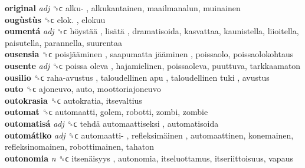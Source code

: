 \textbf{original} \emph{adj}  ␝ϲ   alku- , alkukantainen, maailmanalun, muinainen  \\
\textbf{ougùstùs} ␝ϲ   elok. , elokuu  \\
\textbf{oumentá} \emph{adj}  ␝ϲ   höystää ,  lisätä , dramatisoida, kasvattaa, kaunistella, liioitella, paisutella, parannella, suurentaa  \\
\textbf{ousensia} ␝ϲ   poisjääminen ,  saapumatta jääminen , poissaolo, poissaolokohtaus  \\
\textbf{ousente} \emph{adj}  ␝ϲ   poissa oleva , hajamielinen, poissaoleva, puuttuva, tarkkaamaton  \\
\textbf{ousilio} ␝ϲ   raha-avustus ,  taloudellinen apu ,  taloudellinen tuki , avustus  \\
\textbf{outo} ␝ϲ  ajoneuvo, auto, moottoriajoneuvo  \\
\textbf{outokrasia} ␝ϲ  autokratia, itsevaltius  \\
\textbf{outomat} ␝ϲ  automaatti, golem, robotti, zombi, zombie  \\
\textbf{outomatisá} \emph{adj}  ␝ϲ   tehdä automaattiseksi , automatisoida  \\
\textbf{outomátiko} \emph{adj}  ␝ϲ   automaatti- ,  refleksimäinen , automaattinen, konemainen, refleksinomainen, robottimainen, tahaton  \\
\textbf{outonomia} \emph{n}  ␝ϲ   itsenäisyys , autonomia, itseluottamus, itseriittoisuus, vapaus  \\
